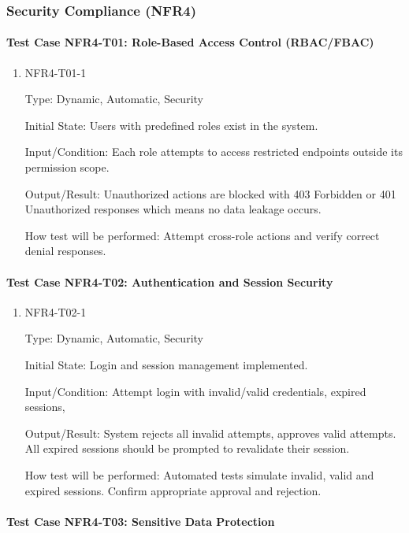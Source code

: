 \documentclass[12pt, titlepage]{article}
\begin{document}
\subsubsection{Security Compliance (NFR4)}

\paragraph{Test Case NFR4-T01: Role-Based Access Control (RBAC/FBAC)}

\begin{enumerate}
\item{NFR4-T01-1\\}

Type: Dynamic, Automatic, Security

Initial State: Users with predefined roles exist in the system.

Input/Condition: Each role attempts to access restricted endpoints outside its permission scope.

Output/Result: Unauthorized actions are blocked with 403 Forbidden or 401 Unauthorized responses which means no data leakage occurs.

How test will be performed: Attempt cross-role actions and verify correct denial responses.
\end{enumerate}

\paragraph{Test Case NFR4-T02: Authentication and Session Security}

\begin{enumerate}
\item{NFR4-T02-1\\}

Type: Dynamic, Automatic, Security

Initial State: Login and session management implemented.

Input/Condition: Attempt login with invalid/valid credentials, expired sessions,

Output/Result: System rejects all invalid attempts, approves valid attempts. All expired sessions should be prompted to revalidate their session.

How test will be performed: Automated tests simulate invalid, valid and expired sessions. Confirm appropriate approval and rejection.
\end{enumerate}

\paragraph{Test Case NFR4-T03: Sensitive Data Protection}
\end{document}
